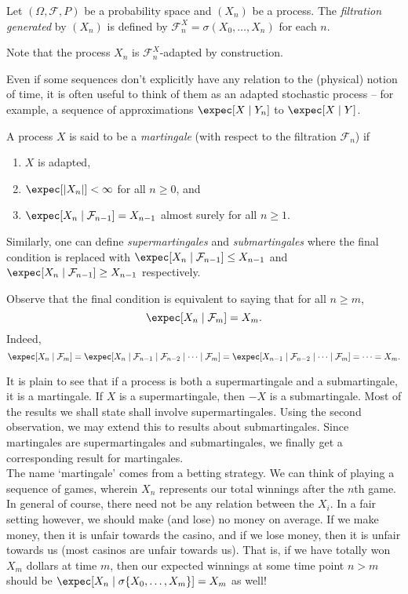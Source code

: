 		\begin{definition}
			Let $(\Omega,\mathcal{F},P)$ be a probability space and $(X_n)$ be a process. The \textit{filtration generated} by $(X_n)$ is defined by $\mathcal{F}_n^X=\sigma(X_0,\ldots,X_n)$ for each $n$.
		\end{definition}
		Note that the process $X_n$ is $\mathcal{F}_n^X$-adapted by construction.

		Even if some sequences don't explicitly have any relation to the (physical) notion of time, it is often useful to think of them as an adapted stochastic process -- for example, a sequence of approximations $\expec[X\mid Y_n]$ to $\expec[X\mid Y]$.

		\begin{fdef}
			A process $X$ is said to be a \textit{martingale} (with respect to the filtration $\mathcal{F}_n$) if
			\begin{enumerate}
				\item $X$ is adapted,
				\item $\expec[|X_n|] < \infty$ for all $n \ge 0$, and
				\item $\expec[X_n \mid \mathcal{F}_{n-1}] = X_{n-1}$ almost surely for all $n \ge 1$.
			\end{enumerate}
			Similarly, one can define \emph{supermartingales} and \emph{submartingales} where the final condition is replaced with $\expec[X_n \mid \mathcal{F}_{n-1}] \le X_{n-1}$ and $\expec[X_n \mid \mathcal{F}_{n-1}] \ge X_{n-1}$ respectively.
		\end{fdef}

		Observe that the final condition is equivalent to saying that for all $n \ge m$,
		\[ \expec[X_n \mid \mathcal{F}_{m}] = X_m. \]
		Indeed,
		\[ \expec[X_n \mid \mathcal{F}_{m}] = \expec[X_n \mid \mathcal{F}_{n-1} \mid \mathcal{F}_{n-2} \mid \cdots \mid \mathcal{F}_m] = \expec[X_{n-1} \mid \mathcal{F}_{n-2} \mid \cdots \mid \mathcal{F}_m] = \cdots = X_m. \]

		It is plain to see that if a process is both a supermartingale and a submartingale, it is a martingale. If $X$ is a supermartingale, then $-X$ is a submartingale. Most of the results we shall state shall involve supermartingales. Using the second observation, we may extend this to results about submartingales. Since martingales are supermartingales and submartingales, we finally get a corresponding result for martingales.\\

		The name `martingale' comes from a betting strategy. We can think of playing a sequence of games, wherein $X_n$ represents our total winnings after the $n$th game. In general of course, there need not be any relation between the $X_i$. In a fair setting however, we should make (and lose) no money on average. If we make money, then it is unfair towards the casino, and if we lose money, then it is unfair towards us (most casinos are unfair towards us). That is, if we have totally won $X_m$ dollars at time $m$, then our expected winnings at some time point $n>m$ should be $\expec[X_n \mid \sigma\{X_0,\ldots,X_m\}] = X_m$ as well!\\

